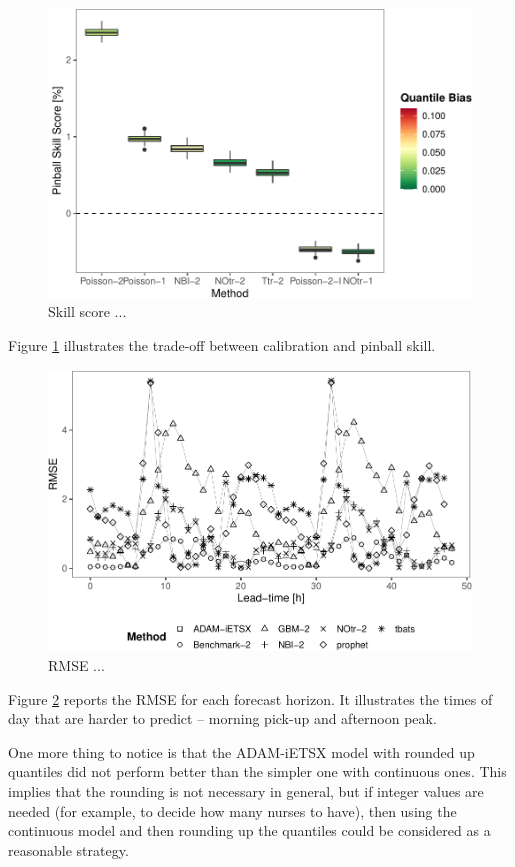 \documentclass[]{elsarticle} %
\begin{document}
\begin{figure}[H]

{\centering \includegraphics[width=0.7\linewidth]{paper_files/figure-latex/Skill-rel2bench-reduced-1} 

}

\caption{Skill score ...}\label{fig:Skill-rel2bench-reduced}
\end{figure}

Figure \ref{fig:Skill-rel2bench-reduced} illustrates the trade-off between calibration and pinball skill.

\begin{figure}[H]

{\centering \includegraphics[width=0.7\linewidth]{paper_files/figure-latex/lead-time-rmse-1} 

}

\caption{RMSE ...}\label{fig:lead-time-rmse}
\end{figure}

Figure \ref{fig:lead-time-rmse} reports the RMSE for each forecast horizon. It illustrates the times of day that are harder to predict -- morning pick-up and afternoon peak.

One more thing to notice is that the ADAM-iETSX model with rounded up quantiles did not perform better than the simpler one with continuous ones. This implies that the rounding is not necessary in general, but if integer values are needed (for example, to decide how many nurses to have), then using the continuous model and then rounding up the quantiles could be considered as a reasonable strategy.
\end{document}

